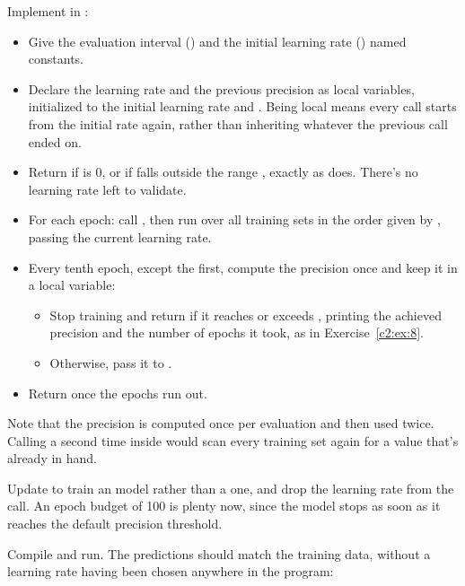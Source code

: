 \label{c2:ex:13}
Implement  in :
\begin{itemize}
  \item Give the evaluation interval () and the initial learning rate () named
    constants.
  \item Declare the learning rate and the previous precision as local variables, initialized to the
    initial learning rate and . Being local means every call starts from the initial rate
    again, rather than inheriting whatever the previous call ended on.
  \item Return  if  is 0, or if  falls outside
    the range , exactly as  does. There's no learning rate left to
    validate.
  \item For each epoch: call , then run  over all training sets in
    the order given by , passing the current learning rate.
  \item Every tenth epoch, except the first, compute the precision once and keep it in a local
    variable:
  \begin{itemize}
    \item Stop training and return  if it reaches or exceeds ,
      printing the achieved precision and the number of epochs it took, as in
      Exercise~\ref{c2:ex:8}.
    \item Otherwise, pass it to .
  \end{itemize}
  \item Return  once the epochs run out.
\end{itemize}
Note that the precision is computed once per evaluation and then used twice. Calling
 a second time inside  would scan every training set
again for a value that's already in hand.

\label{c2:ex:14}
Update  to train an  model rather than a 
one, and drop the learning rate from the  call. An epoch budget of 100 is plenty now,
since the model stops as soon as it reaches the default precision threshold.

Compile and run. The predictions should match the training data, without a learning rate having
been chosen anywhere in the program:

